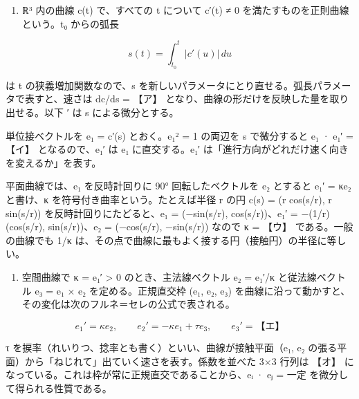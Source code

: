\documentclass[
  10pt,
  a4paper,
]{article}
\providecommand{\tightlist}{%
  \setlength{\itemsep}{0pt}\setlength{\parskip}{0pt}}
\begin{document}
\begin{enumerate}
\def\labelenumi{(\arabic{enumi})}
\tightlist
\item
  {\fallbackfont ℝ}³ 内の曲線 c(t) で、すべての t について c′(t) ≠ 0
  を満たすものを正則曲線という。t{\fallbackfont ₀} からの弧長
\end{enumerate}

\[s(t) = \int_{t_0}^{t} |c'(u)|\, du\]

は t の狭義増加関数なので、s
を新しいパラメータにとり直せる。弧長パラメータで表すと、速さは
\textbar dc/ds\textbar{} = 【ア】
となり、曲線の形だけを反映した量を取り出せる。以下 ′ は s
による微分とする。

単位接ベクトルを e{\fallbackfont ₁} = c′(s)
とおく。\textbar e{\fallbackfont ₁}\textbar² = 1 の両辺を s で微分すると
e{\fallbackfont ₁} · e{\fallbackfont ₁}′ = 【イ】
となるので、e{\fallbackfont ₁}′ は e{\fallbackfont ₁}
に直交する。e{\fallbackfont ₁}′
は「進行方向がどれだけ速く向きを変えるか」を表す。

平面曲線では、e{\fallbackfont ₁} を反時計回りに 90° 回転したベクトルを
e{\fallbackfont ₂} とすると e{\fallbackfont ₁}′ = κe{\fallbackfont ₂}
と書け、κ を符号付き曲率という。たとえば半径 r の円 c(s) = (r cos(s/r),
r sin(s/r)) を反時計回りにたどると、e{\fallbackfont ₁} = (−sin(s/r),
cos(s/r))、e{\fallbackfont ₁}′ = −(1/r)(cos(s/r),
sin(s/r))、e{\fallbackfont ₂} = (−cos(s/r), −sin(s/r)) なので κ = 【ウ】
である。一般の曲線でも 1/\textbar κ\textbar{}
は、その点で曲線に最もよく接する円（接触円）の半径に等しい。

\begin{enumerate}
\def\labelenumi{(\arabic{enumi})}
\setcounter{enumi}{1}
\tightlist
\item
  空間曲線で κ = \textbar e{\fallbackfont ₁}′\textbar{} \textgreater{} 0
  のとき、主法線ベクトル e{\fallbackfont ₂} = e{\fallbackfont ₁}′/κ
  と従法線ベクトル e{\fallbackfont ₃} = e{\fallbackfont ₁} ×
  e{\fallbackfont ₂} を定める。正規直交枠 (e{\fallbackfont ₁},
  e{\fallbackfont ₂}, e{\fallbackfont ₃})
  を曲線に沿って動かすと、その変化は次のフルネ＝セレの公式で表される。
\end{enumerate}

\[e_1' = \kappa e_2, \qquad e_2' = -\kappa e_1 + \tau e_3, \qquad e_3' = \text{【エ】}\]

τ
を捩率（れいりつ、捻率とも書く）といい、曲線が接触平面（e{\fallbackfont ₁},
e{\fallbackfont ₂}
の張る平面）から「ねじれて」出ていく速さを表す。係数を並べた 3×3 行列は
【オ】
になっている。これは枠が常に正規直交であることから、e{\fallbackfont ᵢ} ·
e{\fallbackfont ⱼ} = 一定 を微分して得られる性質である。
\end{document}
